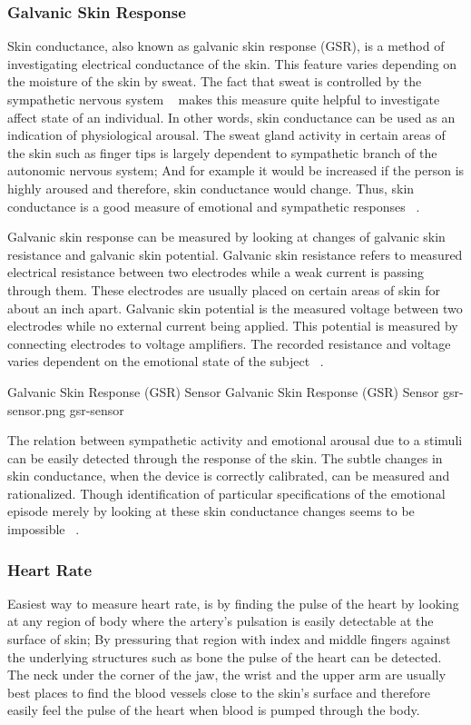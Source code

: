 \documentclass{uofsthesis-cs}
\begin{document}
\subsubsection{Galvanic Skin Response}
Skin conductance, also known as galvanic skin response (GSR), is a method of investigating electrical conductance of the skin. This feature varies depending on the moisture of the skin by sweat. The fact that sweat is controlled by the sympathetic nervous system ~\cite{seiger2002essentials} makes this measure quite helpful to investigate affect state of an individual. In other words, skin conductance can be used as an indication of physiological arousal. The sweat gland activity in certain areas of the skin such as finger tips is largely dependent to sympathetic branch of the autonomic nervous system; And for example it would be increased if the person is highly aroused and therefore, skin conductance would change. Thus, skin conductance is a good measure of emotional and sympathetic responses ~\cite{carlson2013physiology}.

Galvanic skin response can be measured by looking at changes of galvanic skin resistance and galvanic skin potential. Galvanic skin resistance refers to measured electrical resistance between two electrodes while a weak current is passing through them. These electrodes are usually placed on certain areas of skin for about an inch apart. Galvanic skin potential is the measured voltage between two electrodes while no external current being applied. This potential is measured by connecting electrodes to voltage amplifiers. The recorded resistance and voltage varies dependent on the emotional state of the subject ~\cite{pflanzer2013galvanic}.

\img
{Galvanic Skin Response (GSR) Sensor}
{Galvanic Skin Response (GSR) Sensor}
{gsr-sensor.png}
{gsr-sensor}

The relation between sympathetic activity and emotional arousal due to a stimuli can be easily detected through the response of the skin. The subtle changes in skin conductance, when the device is correctly calibrated, can be measured and rationalized. Though identification of particular specifications of the emotional episode merely by looking at these skin conductance changes seems to be impossible ~\cite{pflanzer2013galvanic}.

\subsubsection{Heart Rate}
Easiest way to measure heart rate, is by finding the pulse of the heart by looking at any region of body where the artery's pulsation is easily detectable at the surface of skin; By pressuring that region with index and middle fingers against the underlying structures such as bone the pulse of the heart can be detected. The neck under the corner of the jaw, the wrist and the upper arm are usually best places to find the blood vessels close to the skin's surface and therefore easily feel the pulse of the heart when blood is pumped through the body.
\end{document}
